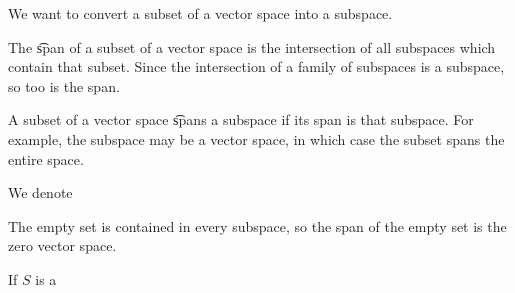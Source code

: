 

We want to convert a subset of a vector space into a subspace.


The \t{span} of a subset of a vector space is the intersection of all subspaces which contain that subset.
Since the intersection of a family of subspaces is a subspace, so too is the span.

A subset of a vector space \t{spans} a subspace if its span is that subspace.
For example, the subspace may be a vector space, in which case the subset spans the entire space.


We denote


\begin{prop}
  The empty set is contained in every subspace, so the span of the empty set is the zero vector space.
\end{prop}

If $S$ is a
